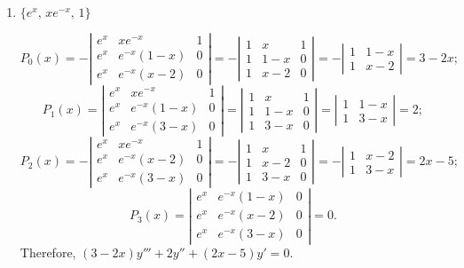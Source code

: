 \documentclass{ximera}
\begin{document}
\begin{problem}
\begin{enumerate}
 \item  $\{e^x,\,xe^{-x},\,1\}$

\begin{solution}
$$
P_0(x)=
-\left|\begin{array}
{ccc}e^x&xe^{-x}&1\\
e^x&e^{-x}(1-x)&0\\
e^x&e^{-x}(x-2)&0
\end{array}\right|=
-\left|\begin{array}{ccc}
1&x&1\\1&1-x&0\\1&x-2&0
\end{array}\right|=
-\left|\begin{array}{ccc}
1&1-x\\1&x-2
\end{array}\right|=3-2x;
$$
$$
P_1(x)=
\left|\begin{array}{ccc}
e^x&xe^{-x}&1\\
e^x&e^{-x}(1-x)&0\\
e^x&e^{-x}(3-x)&0
\end{array}\right|=
\left|\begin{array}{ccc}
1&x&1\\
1&1-x&0\\
1&3-x&0
\end{array}\right|=
\left|\begin{array}{ccc}
1&1-x\\
1&3-x
\end{array}\right|=2;
$$
$$
P_2(x)=
-\left|\begin{array}{ccc}
e^x&xe^{-x}&1\\
e^x&e^{-x}(x-2)&0\\
e^x&e^{-x}(3-x)&0
\end{array}\right|=
-\left|\begin{array}{ccc}
1&x&1\\
1&x-2&0\\
1&3-x&0
\end{array}\right|=
-\left|\begin{array}{ccc}
1&x-2\\
1&3-x
\end{array}\right|=2x-5;
$$
$$
P_3(x)=
\left|\begin{array}{ccc}
e^x&e^{-x}(1-x)&0\\
e^x&e^{-x}(x-2)&0\\
e^x&e^{-x}(3-x)&0
\end{array}\right|=0.
$$
Therefore,
$(3-2x)y'''+2y''+(2x-5)y'=0$.
\end{solution}
 

\end{enumerate}
\end{problem}
\end{document}
